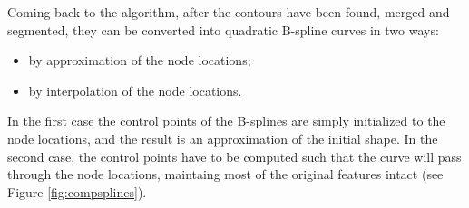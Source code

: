 \documentclass[]{usiinfbachelorproject}
\begin{document}
Coming back to the algorithm, after the contours have been found, merged and segmented, they can be converted into quadratic B-spline curves in two ways:
\begin{itemize}
	\item by approximation of the node locations;
	\item by interpolation of the node locations. 
\end{itemize}
In the first case the control points of the B-splines are simply initialized to the node locations, and the result is an approximation of the initial shape. In the second case, the control points have to be computed such that the curve will pass through the node locations, maintaing most of the original features intact (see Figure \ref{fig:compsplines}).

\begin{figure}[ht]
	\centering
	\\
\end{figure}
\end{document}
